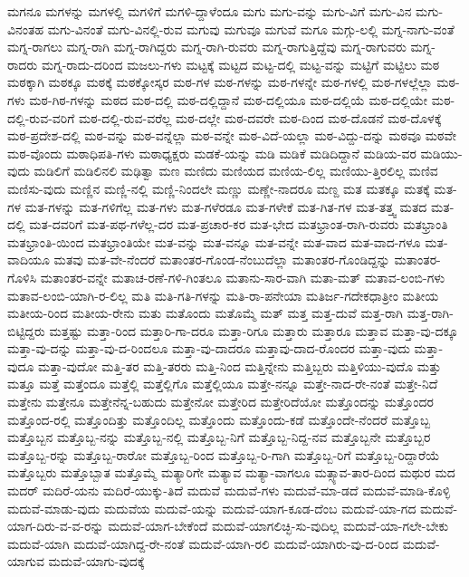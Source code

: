 {ಮಗನೂ
ಮಗಳನ್ನು
ಮಗಳಲ್ಲಿ
ಮಗಳಿಗೆ
ಮಗಳಿ-ದ್ದಾಳೆಂದೂ
ಮಗು
ಮಗು-ವನ್ನು
ಮಗು-ವಿಗೆ
ಮಗು-ವಿನ
ಮಗು-ವಿನಂತಹ
ಮಗು-ವಿನಂತೆ
ಮಗು-ವಿನಲ್ಲಿ-ರುವ
ಮಗುವು
ಮಗುವೂ
ಮಗುವೆ
ಮಗೂ
ಮಗ್ಗು-ಲಲ್ಲಿ
ಮಗ್ನ-ನಾಗು-ವಂತೆ
ಮಗ್ನ-ರಾಗಲು
ಮಗ್ನ-ರಾಗಿ
ಮಗ್ನ-ರಾಗಿದ್ದರು
ಮಗ್ನ-ರಾಗಿ-ರುವರು
ಮಗ್ನ-ರಾಗುತ್ತಿದ್ದೆವು
ಮಗ್ನ-ರಾಗುವರು
ಮಗ್ನ-ರಾದರು
ಮಗ್ನ-ರಾದು-ದರಿಂದ
ಮಜಲು-ಗಳು
ಮಟ್ಟಕ್ಕೆ
ಮಟ್ಟದ
ಮಟ್ಟ-ದಲ್ಲಿ
ಮಟ್ಟ-ವನ್ನು
ಮಟ್ಟಿಗೆ
ಮಟ್ಟಿಲು
ಮಠ
ಮಠಕ್ಕಾಗಿ
ಮಠಕ್ಕೂ
ಮಠಕ್ಕೆ
ಮಠಕ್ಕೋಸ್ಕರ
ಮಠ-ಗಳ
ಮಠ-ಗಳನ್ನು
ಮಠ-ಗಳನ್ನೇ
ಮಠ-ಗಳಲ್ಲಿ
ಮಠ-ಗಳಲ್ಲೆಲ್ಲಾ
ಮಠ-ಗಳು
ಮಠ-ಗಿಠ-ಗಳನ್ನು
ಮಠದ
ಮಠ-ದಲ್ಲಿ
ಮಠ-ದಲ್ಲಿದ್ದಾನೆ
ಮಠ-ದಲ್ಲಿಯೂ
ಮಠ-ದಲ್ಲಿಯೆ
ಮಠ-ದಲ್ಲಿಯೇ
ಮಠ-ದಲ್ಲಿ-ರುವ-ವರಿಗೆ
ಮಠ-ದಲ್ಲಿ-ರುವ-ವರೆಲ್ಲ
ಮಠ-ದಲ್ಲೇ
ಮಠ-ದವರೇ
ಮಠ-ದಿಂದ
ಮಠ-ದೊಡನೆ
ಮಠ-ದೊಳಕ್ಕೆ
ಮಠ-ಪ್ರದೇಶ-ದಲ್ಲಿ
ಮಠ-ವನ್ನು
ಮಠ-ವನ್ನೆಲ್ಲಾ
ಮಠ-ವನ್ನೇ
ಮಠ-ವಿದೆ-ಯಲ್ಲಾ
ಮಠ-ವಿದ್ದು-ದನ್ನು
ಮಠವೂ
ಮಠವೇ
ಮಠ-ವೊಂದು
ಮಠಾಧಿಪತಿ-ಗಳು
ಮಠಾಧ್ಯಕ್ಷರು
ಮಡಕೆ-ಯನ್ನು
ಮಡಿ
ಮಡಿಕೆ
ಮಡಿದಿದ್ದಾನೆ
ಮಡಿಯ-ವರ
ಮಡಿಯು-ವುದು
ಮಡಿಲಿಗೆ
ಮಡಿಲಿನಲಿ
ಮಢಿತ್ವಾ
ಮಣ
ಮಣಿದು
ಮಣಿಯದ
ಮಣಿಯ-ಲಿಲ್ಲ
ಮಣಿಯು-ತ್ತಿರಲಿಲ್ಲ
ಮಣಿವ
ಮಣಿಸು-ವುದು
ಮಣ್ಣಿನ
ಮಣ್ಣಿ-ನಲ್ಲಿ
ಮಣ್ಣಿ-ನಿಂದಲೇ
ಮಣ್ಣು
ಮಣ್ಣೇ-ನಾದರೂ
ಮಣ್ದ
ಮತ
ಮತಕ್ಕೂ
ಮತಕ್ಕೆ
ಮತ-ಗಳ
ಮತ-ಗಳನ್ನು
ಮತ-ಗಳಿಗೆಲ್ಲ
ಮತ-ಗಳು
ಮತ-ಗಳೆರಡೂ
ಮತ-ಗಳೇಕೆ
ಮತ-ಗಿತ-ಗಳ
ಮತ-ತತ್ತ್ವ
ಮತದ
ಮತ-ದಲ್ಲಿ
ಮತ-ದವರಿಗೆ
ಮತ-ಪಥ-ಗಳೆಲ್ಲ-ದರ
ಮತ-ಪ್ರಚಾರ-ಕರ
ಮತ-ಭೇದ
ಮತಭ್ರಾಂತ-ರಾಗಿ-ರುವರು
ಮತಭ್ರಾಂತಿ
ಮತಭ್ರಾಂತಿ-ಯಿಂದ
ಮತಭ್ರಾಂತಿಯೇ
ಮತ-ವನ್ನು
ಮತ-ವನ್ನೂ
ಮತ-ವನ್ನೇ
ಮತ-ವಾದ
ಮತ-ವಾದ-ಗಳೂ
ಮತ-ವಾದಿಯೂ
ಮತವು
ಮತ-ವೇ-ನೆಂದರೆ
ಮತಾಂತರ-ಗೊಂಡ-ನೆಂಬುದೆಲ್ಲಾ
ಮತಾಂತರ-ಗೊಂಡಿದ್ದನ್ನು
ಮತಾಂತರ-ಗೊಳಿಸಿ
ಮತಾಂತರ-ವನ್ನೇ
ಮತಾಚ-ರಣೆ-ಗಳಿ-ಗಿಂತಲೂ
ಮತಾನು-ಸಾರ-ವಾಗಿ
ಮತಾ-ಮತ್
ಮತಾವ-ಲಂಬಿ-ಗಳು
ಮತಾವ-ಲಂಬಿ-ಯಾಗಿ-ರ-ಲಿಲ್ಲ
ಮತಿ
ಮತಿ-ಗತಿ-ಗಳನ್ನು
ಮತಿ-ರಾ-ಪನೇಯಾ
ಮತಿರ್ಜ-ಗದೇಕಧಾತ್ರೀಂ
ಮತೀಯ
ಮತೀಯ-ರಿಂದ
ಮತೀಯ-ರೇನು
ಮತು
ಮತೊಂದು
ಮತೊಮ್ಮೆ
ಮತ್
ಮತ್ತ
ಮತ್ತ-ದುವೆ
ಮತ್ತ-ರಾಗಿ
ಮತ್ತ-ರಾಗಿ-ಬಿಟ್ಟಿದ್ದರು
ಮತ್ತಷ್ಟು
ಮತ್ತಾ-ರಿಂದ
ಮತ್ತಾರಿ-ಗಾ-ದರೂ
ಮತ್ತಾ-ರಿಗೂ
ಮತ್ತಾರು
ಮತ್ತಾರೂ
ಮತ್ತಾವ
ಮತ್ತಾ-ವು-ದಕ್ಕೂ
ಮತ್ತಾ-ವು-ದನ್ನು
ಮತ್ತಾ-ವು-ದ-ರಿಂದಲೂ
ಮತ್ತಾ-ವು-ದಾದರೂ
ಮತ್ತಾವು-ದಾದ-ರೊಂದರ
ಮತ್ತಾ-ವುದು
ಮತ್ತಾ-ವುದೂ
ಮತ್ತಾ-ವುದೋ
ಮತ್ತಿ-ತರ
ಮತ್ತಿ-ತರರು
ಮತ್ತಿ-ನಿಂದ
ಮತ್ತಿನ್ನೇನು
ಮತ್ತಿಬ್ಬರು
ಮತ್ತಿಳಿಯು-ವುದೊ
ಮತ್ತು
ಮತ್ತೂ
ಮತ್ತೆ
ಮತ್ತೆಂದೂ
ಮತ್ತೆಲ್ಲಿ
ಮತ್ತೆಲ್ಲಿಗೊ
ಮತ್ತೆಲ್ಲಿಯೂ
ಮತ್ತೇ-ನನ್ನೂ
ಮತ್ತೇ-ನಾದ-ರೇ-ನಂತೆ
ಮತ್ತೇ-ನಿದೆ
ಮತ್ತೇನು
ಮತ್ತೇನೂ
ಮತ್ತೇನೆನ್ನ-ಬಹುದು
ಮತ್ತೇನೋ
ಮತ್ತೇರಿದ
ಮತ್ತೇರಿದೆಯೋ
ಮತ್ತೊಂದನ್ನು
ಮತ್ತೊಂದರ
ಮತ್ತೊಂದ-ರಲ್ಲಿ
ಮತ್ತೊಂದಿತ್ತು
ಮತ್ತೊಂದಿಲ್ಲ
ಮತ್ತೊಂದು
ಮತ್ತೊಂದು-ಕಡೆ
ಮತ್ತೊಂದೇ-ನೆಂದರೆ
ಮತ್ತೊಬ್ಬ
ಮತ್ತೊಬ್ಬನ
ಮತ್ತೊಬ್ಬ-ನನ್ನು
ಮತ್ತೊಬ್ಬ-ನಲ್ಲಿ
ಮತ್ತೊಬ್ಬ-ನಿಗೆ
ಮತ್ತೊಬ್ಬ-ನಿದ್ದ-ನವ
ಮತ್ತೊಬ್ಬನೇ
ಮತ್ತೊಬ್ಬರ
ಮತ್ತೊಬ್ಬ-ರನ್ನು
ಮತ್ತೊಬ್ಬ-ರಾರೋ
ಮತ್ತೊಬ್ಬ-ರಿಂದ
ಮತ್ತೊಬ್ಬ-ರಿ-ಗಾಗಿ
ಮತ್ತೊಬ್ಬ-ರಿಗೆ
ಮತ್ತೊಬ್ಬ-ರಿದ್ದಾರೆಯೆ
ಮತ್ತೊಬ್ಬರು
ಮತ್ತೊಬ್ಬಾತ
ಮತ್ತೊಮ್ಮೆ
ಮತ್ಯಾರಿಗೇ
ಮತ್ಯಾವ
ಮತ್ಯಾ-ವಾಗಲೂ
ಮತ್ಸ್ಯಾವ-ತಾರ-ದಿಂದ
ಮಥುರ
ಮದ
ಮದರ್
ಮದಿರೆ-ಯನು
ಮದಿರೆ-ಯುಕ್ಕು-ತಿದೆ
ಮದುವೆ
ಮದುವೆ-ಗಳು
ಮದುವೆ-ಮಾ-ಡದೆ
ಮದುವೆ-ಮಾಡಿ-ಕೊಳ್ಳಿ
ಮದುವೆ-ಮಾಡು-ವುದು
ಮದುವೆಯ
ಮದುವೆ-ಯನ್ನು
ಮದುವೆ-ಯಾಗ-ಕೂಡ-ದೆಂಬ
ಮದುವೆ-ಯಾ-ಗದ
ಮದುವೆ-ಯಾಗ-ದಿರು-ವ-ವ-ರನ್ನು
ಮದುವೆ-ಯಾಗ-ಬೇಕೆಂದೆ
ಮದುವೆ-ಯಾಗಲಿಚ್ಛಿ-ಸು-ವುದಿಲ್ಲ
ಮದುವೆ-ಯಾ-ಗಲೇ-ಬೇಕು
ಮದುವೆ-ಯಾಗಿ
ಮದುವೆ-ಯಾಗಿದ್ದ-ರೇ-ನಂತೆ
ಮದುವೆ-ಯಾಗಿ-ರಲಿ
ಮದುವೆ-ಯಾಗಿರು-ವು-ದ-ರಿಂದ
ಮದುವೆ-ಯಾಗುವ
ಮದುವೆ-ಯಾಗು-ವುದಕ್ಕೆ
}
